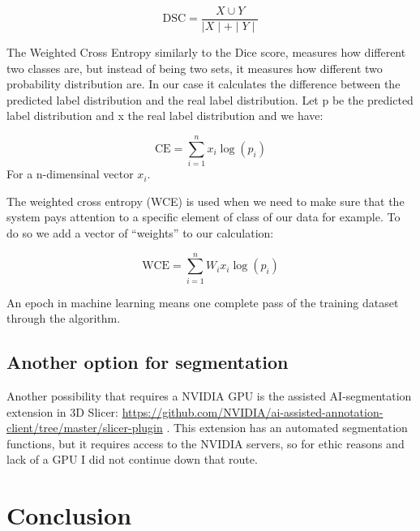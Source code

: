 \documentclass[12pt]{article}
\begin{document}
\begin{equation}
\mbox{DSC} = \frac{X \cup  Y} {\mid X \mid + \mid Y \mid }
\end{equation}
  
The Weighted Cross Entropy  similarly to the Dice score,
measures how different two classes are, but instead of being two sets,
it measures how different two probability distribution are. In our
case it calculates the difference between the predicted label
distribution and the real label distribution. Let p be the predicted
label distribution and x the real label distribution and we have:

\begin{equation}
\mbox{CE} = \sum_{i=1}^{n} x_i \log(p_i)
\end{equation}
For a n-dimensinal vector $x_i$.

The weighted cross entropy (WCE) is used when we need to make sure
that the system pays attention to a specific element of class of our
data for example. To do so we add a vector of “weights” to our
calculation:

\begin{equation}
\mbox{WCE} = \sum_{i=1}^{n} W_i x_i \log(p_i)
\end{equation}

An epoch in machine learning means one complete pass of the training
dataset through the algorithm.


\subsection{Another option for segmentation}

Another possibility that requires a NVIDIA GPU is the assisted
AI-segmentation extension in 3D Slicer:
\url{https://github.com/NVIDIA/ai-assisted-annotation-client/tree/master/slicer-plugin}
.
This extension has an automated segmentation functions, but it
requires access to the NVIDIA servers, so for ethic reasons and lack
of a GPU I did not continue down that route.

\section{Conclusion}



\end{document}
